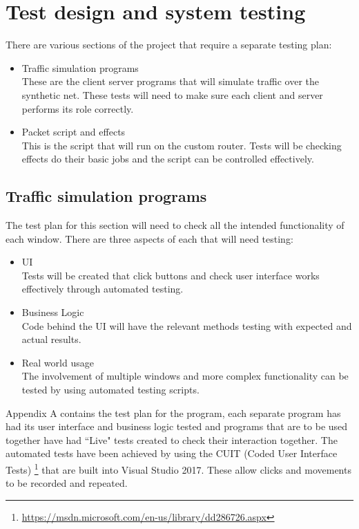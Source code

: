 \section{Test design and system testing}
There are various sections of the project that require a separate testing plan:

\begin{itemize}

	\item Traffic simulation programs\\
	These are the client server programs that will simulate traffic over the synthetic net. These tests will need to 	make 	sure each client and server performs its role correctly.
	
	\item Packet script and effects\\
	This is the script that will run on the custom router. Tests will be checking effects do their basic jobs and 			the script can be controlled effectively.
	
\end{itemize}

\subsection{Traffic simulation programs}
The test plan for this section will need to check all the intended functionality of each window. There are three aspects of each that will need testing:

\begin{itemize}

	\item UI \\
	Tests will be created that click buttons and check user interface works effectively through automated testing.

	\item Business Logic \\
	Code behind the UI will have the relevant methods testing with expected and actual results.

	\item Real world usage \\
	The involvement of multiple windows and more complex functionality can be tested by using automated testing 			scripts.
	
\end{itemize}

Appendix A contains the test plan for the program, each separate program has had its user interface and business logic tested and programs that are to be used together have had ``Live" tests created to check their interaction together. The automated tests have been achieved by using the CUIT (Coded User Interface Tests) \footnote{\url{https://msdn.microsoft.com/en-us/library/dd286726.aspx}} that are built into Visual Studio 2017. These allow clicks and movements to be recorded and repeated.

